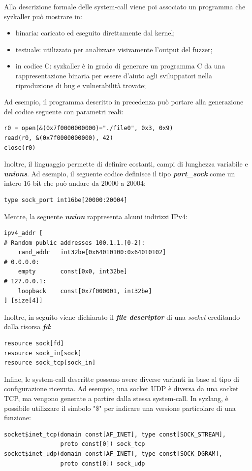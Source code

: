 \documentclass{article}
\begin{document}
Alla descrizione formale delle system-call viene poi associato un programma che syzkaller 
può mostrare in:
\begin{itemize}
  \item binaria: caricato ed eseguito direttamente dal kernel;
  \item testuale: utilizzato per analizzare visivamente l'output del fuzzer;
  \item in codice C: syzkaller è in grado di generare un programma C da una rappresentazione
    binaria per essere d'aiuto agli sviluppatori nella riproduzione di bug e vulnerabilità 
    trovate;
\end{itemize}

Ad esempio, il programma descritto in precedenza può portare alla generazione del codice 
seguente con parametri reali:

\begin{verbatim}
r0 = open(&(0x7f0000000000)="./file0", 0x3, 0x9)
read(r0, &(0x7f0000000000), 42)
close(r0) 
\end{verbatim}

Inoltre, il linguaggio permette di definire costanti, campi di lunghezza variabile e 
\textbf{\textit{unions}}. Ad esempio, il seguente codice definisce il tipo \textbf{\textit{port\_sock}} 
come un intero $16$-bit che può andare da $20000$ a $20004$: 

\begin{verbatim}
type sock_port int16be[20000:20004] 
\end{verbatim}

Mentre, la seguente \textbf{\textit{union}} rappresenta alcuni indirizzi IPv4:

\begin{verbatim}
ipv4_addr [
# Random public addresses 100.1.1.[0-2]:
	rand_addr	int32be[0x64010100:0x64010102]
# 0.0.0.0:
	empty		const[0x0, int32be]
# 127.0.0.1:
	loopback	const[0x7f000001, int32be]
] [size[4]]
\end{verbatim}

Inoltre, in seguito viene dichiarato il \textbf{\textit{file descriptor}} di una \textit{socket}
ereditando dalla risorsa \textbf{\textit{fd}}\cite{SyzkallerExternalNetworking}:

\begin{verbatim}
resource sock[fd]
resource sock_in[sock]
resource sock_tcp[sock_in]
\end{verbatim}

Infine, le system-call descritte possono avere diverse varianti in base al tipo di configurazione 
ricevuta. Ad esempio, una socket UDP è diversa da una socket TCP, ma vengono generate a 
partire dalla stessa system-call. In syzlang, è possibile utilizzare il simbolo "\$" per 
indicare una versione particolare di una funzione\cite{SyzkallerExternalNetworking}:
\begin{verbatim}
socket$inet_tcp(domain const[AF_INET], type const[SOCK_STREAM],
                proto const[0]) sock_tcp
socket$inet_udp(domain const[AF_INET], type const[SOCK_DGRAM],
                proto const[0]) sock_udp

\end{verbatim}
\end{document}
